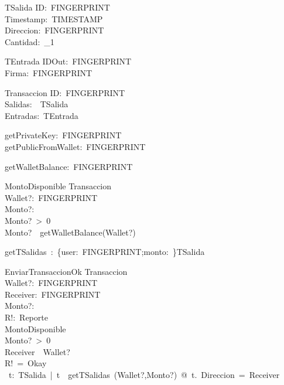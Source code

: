 \begin{schema}{TSalida}
ID:~FINGERPRINT\\
Timestamp:~TIMESTAMP\\
Direccion:~FINGERPRINT\\
Cantidad:~\nat_1\\
\end{schema}
\begin{schema}{TEntrada}
IDOut:~FINGERPRINT\\
Firma:~FINGERPRINT\\
\end{schema}
\begin{schema}{Transaccion}
ID:~FINGERPRINT\\
Salidas:~\power~TSalida\\
Entradas:~\power TEntrada\\
\end{schema}
\begin{axdef}
getPrivateKey:~FINGERPRINT\\
getPublicFromWallet:~FINGERPRINT\\
\end{axdef}
\begin{axdef}
getWalletBalance:~FINGERPRINT~\fun~\integer\\
\end{axdef}
\begin{schema}{MontoDisponible}
\Xi Transaccion\\
Wallet?:~FINGERPRINT\\
Monto?:~\integer\\
\where
Monto?~>~0\\
Monto?~\leq~getWalletBalance(Wallet?)\\
\end{schema}
\begin{axdef}
getTSalidas~:~\{user:~FINGERPRINT;monto:~\integer\}\fun\power TSalida\\
\end{axdef}
\begin{schema}{EnviarTransaccionOk}
\Delta Transaccion\\
Wallet?:~FINGERPRINT\\
Receiver:~FINGERPRINT\\
Monto?:~\integer\\
R!:~Reporte\\
\where
MontoDisponible\\
Monto?~>~0\\
Receiver~\neq~Wallet?\\
R!~=~Okay\\
\forall~t:~TSalida~|~t~\in~getTSalidas~(Wallet?,Monto?)~@~t.~Direccion~=~Receiver\\
\end{schema}
